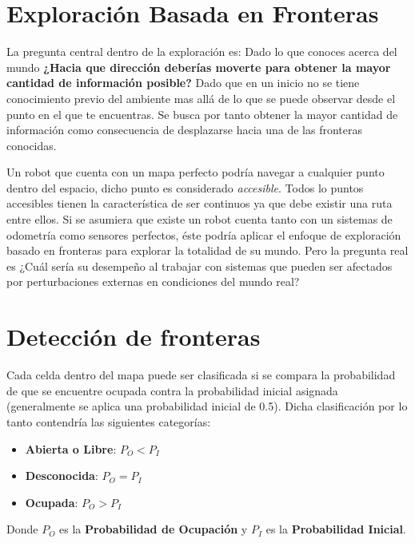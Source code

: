 \documentclass[11pt]{article}
\begin{document}
\section{Exploración Basada en Fronteras}

La pregunta central dentro de la exploración es: Dado lo que conoces acerca del mundo \textbf{¿Hacia que dirección deberías moverte para obtener la mayor cantidad de información posible?} Dado que en un inicio no se tiene conocimiento previo del ambiente mas allá de lo que se puede observar desde el punto en el que te encuentras. Se busca por tanto obtener la mayor cantidad de información como consecuencia de desplazarse hacia una de las fronteras conocidas.

Un robot que cuenta con un mapa perfecto podría navegar a cualquier punto dentro del espacio, dicho punto es considerado \emph{accesible}. Todos lo puntos accesibles tienen la característica de ser continuos ya que debe existir una ruta entre ellos. Si se asumiera que existe un robot cuenta tanto con un sistemas de odometría como sensores perfectos, éste podría aplicar el enfoque de exploración basado en fronteras para explorar la totalidad de su mundo. Pero la pregunta real es ¿Cuál sería su desempeño al trabajar con sistemas que pueden ser afectados por perturbaciones externas en condiciones del mundo real?

\section{Detección de fronteras}

Cada celda dentro del mapa puede ser clasificada si se compara la probabilidad de que se encuentre ocupada contra la probabilidad inicial asignada (generalmente se aplica una probabilidad inicial de 0.5). Dicha clasificación por lo tanto contendría las siguientes categorías:

\begin{itemize}[noitemsep]
	\item \textbf{Abierta o Libre}: $ P_O < P_I $
	\item \textbf{Desconocida}: $ P_O = P_I $
	\item \textbf{Ocupada}: $ P_O > P_I $
\end{itemize}

Donde $ P_O $ es la \textbf{Probabilidad de Ocupación} y $ P_I $ es la \textbf{Probabilidad Inicial}.
\end{document}
